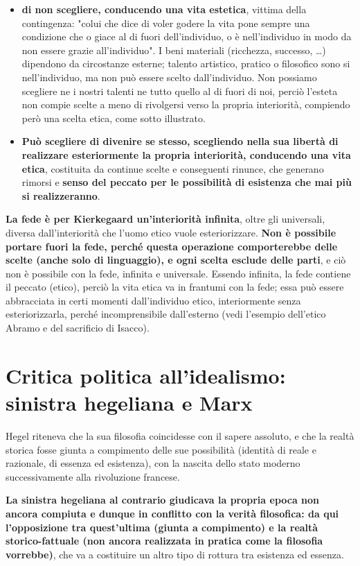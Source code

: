  \begin{itemize}
 	\item \textbf{di non scegliere, conducendo una vita estetica}, vittima della contingenza: "colui che dice di voler godere la vita pone sempre una condizione che o giace al di fuori dell'individuo, o è nell'individuo in modo da non essere grazie all'individuo". I beni materiali (ricchezza, successo, \dots) dipendono da circostanze esterne; talento artistico, pratico o filosofico sono si nell'individuo, ma non può essere scelto dall'individuo. Non possiamo scegliere ne i nostri talenti ne tutto quello al di fuori di noi, perciò l'esteta non compie scelte a meno di rivolgersi verso la propria interiorità, compiendo però una scelta etica, come sotto illustrato.
 	\item \textbf{Può scegliere di divenire se stesso, scegliendo nella sua libertà di realizzare esteriormente la propria interiorità, conducendo una vita etica}, costituita da continue scelte e conseguenti rinunce, che generano rimorsi e \textbf{senso del peccato per le possibilità di esistenza che mai più si realizzeranno}.
 \end{itemize}

\textbf{La fede è per Kierkegaard un'interiorità infinita}, oltre gli universali, diversa dall'interiorità che l'uomo etico vuole esteriorizzare. \textbf{Non è possibile portare fuori la fede, perché questa operazione comporterebbe delle scelte (anche solo di linguaggio), e ogni scelta esclude delle parti}, e ciò non è possibile con la fede, infinita e universale. Essendo infinita, la fede contiene il peccato (etico), perciò la vita etica va in frantumi con la fede; essa può essere abbracciata in certi momenti dall'individuo etico, interiormente senza esteriorizzarla, perché incomprensibile dall'esterno (vedi l'esempio dell'etico Abramo e del sacrificio di Isacco).
 
 \section{Critica politica all'idealismo: sinistra hegeliana e Marx}
 
 Hegel riteneva che la sua filosofia coincidesse con il sapere assoluto, e che la realtà storica fosse giunta a compimento delle sue possibilità (identità di reale e razionale, di essenza ed esistenza), con la nascita dello stato moderno successivamente alla rivoluzione francese.
 
 \textbf{La sinistra hegeliana al contrario giudicava la propria epoca non ancora compiuta e dunque in conflitto con la verità filosofica: da qui l'opposizione tra quest'ultima (giunta a compimento) e la realtà storico-fattuale (non ancora realizzata in pratica come la filosofia vorrebbe)}, che va a costituire un altro tipo di rottura tra esistenza ed essenza.
 
